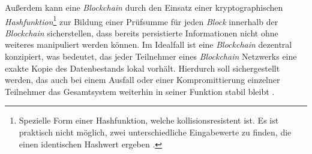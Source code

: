 Außerdem kann eine \textit{Blockchain} durch den Einsatz einer kryptographischen \textit{Hashfunktion}\footnote{Spezielle Form einer Hashfunktion, welche kollisionsresistent ist. Es ist praktisch nicht möglich, zwei unterschiedliche Eingabewerte zu finden, die einen identischen Hashwert ergeben \citep{Menezes1997}.} zur Bildung einer Prüfsumme für jeden \textit{Block} innerhalb der \textit{Blockchain} sicherstellen, dass bereits persistierte Informationen nicht ohne weiteres manipuliert werden können. Im Idealfall ist eine \textit{Blockchain} dezentral konzipiert, was bedeutet, das jeder Teilnehmer eines \textit{Blockchain} Netzwerks eine exakte Kopie des Datenbestands lokal vorhält. Hierdurch soll sichergestellt werden, das auch bei einem Ausfall oder einer Kompromittierung einzelner Teilnehmer das Gesamtsystem weiterhin in seiner Funktion stabil bleibt \citep{Drescher2017, Tribis2018}.





